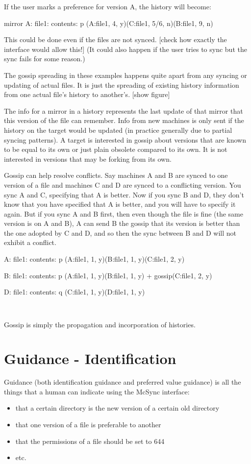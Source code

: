 \documentclass{book}
\begin{document}
If the user marks a preference for version A, the history will become:

	mirror A: file1: contents: p (A:file1, 4, y)(C:file1, 5/6, n)(B:file1, 9, n)

This could be done even if the files are not synced.  [check how exactly the interface would allow this!]  (It could also happen if the user tries to sync but the sync fails for some reason.)

The gossip spreading in these examples happens quite apart from any syncing or updating of actual files.  It is just the spreading of existing history information from one actual file's history to another's.  [show figure]

The info for a mirror in a history represents the last update of that mirror that this version of the file can remember.  Info from new machines is only sent if the history on the target would be updated (in practice generally due to partial syncing patterns).  A target is interested in gossip about versions that are known to be equal to its own or just plain obsolete compared to its own.  It is not interested in versions that may be forking from its own.

Gossip can help resolve conflicts.  Say machines A and B are synced to one version of a file and machines C and D are synced to a conflicting version.  You sync A and C, specifying that A is better.  Now if you sync B and D, they don't know that you have specified that A is better, and you will have to specify it again.  But if you sync A and B first, then even though the file is fine (the same version is on A and B), A can send B the gossip that its version is better than the one adopted by C and D, and so then the sync between B and D will not exhibit a conflict.

	A: file1: contents: p (A:file1, 1, y)(B:file1, 1, y)(C:file1, 2, y)

	B: file1: contents: p (A:file1, 1, y)(B:file1, 1, y) + gossip(C:file1, 2, y)

	D: file1: contents: q (C:file1, 1, y)(D:file1, 1, y)

~

Gossip is simply the propagation and incorporation of histories.


\section{Guidance - Identification}

Guidance (both identification guidance and preferred value guidance) is all the things that a human can indicate using the McSync interface:
\begin{itemize}
\item that a certain directory is the new version of a certain old directory
\item that one version of a file is preferable to another
\item that the permissions of a file should be set to 644
\item etc.
\end{itemize}
\end{document}
